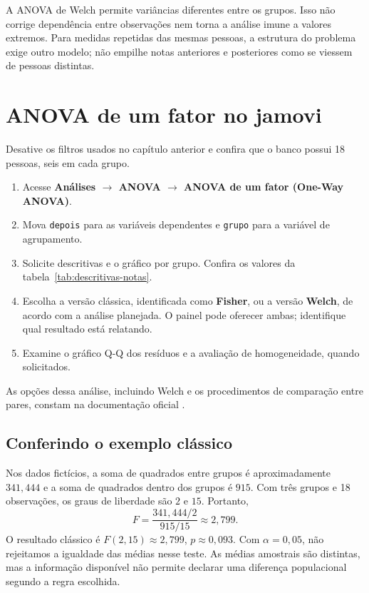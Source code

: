 A ANOVA de Welch permite variâncias diferentes entre os grupos. Isso não corrige dependência entre observações nem torna a análise imune a valores extremos. Para medidas repetidas das mesmas pessoas, a estrutura do problema exige outro modelo; não empilhe notas anteriores e posteriores como se viessem de pessoas distintas.

\section{ANOVA de um fator no jamovi}

Desative os filtros usados no capítulo anterior e confira que o banco possui 18 pessoas, seis em cada grupo.

\begin{enumerate}
  \item Acesse \textbf{Análises $\rightarrow$ ANOVA $\rightarrow$ ANOVA de um fator (One-Way ANOVA)}.
  \item Mova \texttt{depois} para as variáveis dependentes e \texttt{grupo} para a variável de agrupamento.
  \item Solicite descritivas e o gráfico por grupo. Confira os valores da tabela~\ref{tab:descritivas-notas}.
  \item Escolha a versão clássica, identificada como \textbf{Fisher}, ou a versão \textbf{Welch}, de acordo com a análise planejada. O painel pode oferecer ambas; identifique qual resultado está relatando.
  \item Examine o gráfico Q-Q dos resíduos e a avaliação de homogeneidade, quando solicitados.
\end{enumerate}

As opções dessa análise, incluindo Welch e os procedimentos de comparação entre pares, constam na documentação oficial \parencite{JamoviAnova}.

\subsection{Conferindo o exemplo clássico}

Nos dados fictícios, a soma de quadrados entre grupos é aproximadamente $341{,}444$ e a soma de quadrados dentro dos grupos é $915$. Com três grupos e 18 observações, os graus de liberdade são $2$ e $15$. Portanto,
\[
F=\frac{341{,}444/2}{915/15}\approx2{,}799.
\]
O resultado clássico é $F(2,15)\approx2{,}799$, $p\approx0{,}093$. Com $\alpha=0{,}05$, não rejeitamos a igualdade das médias nesse teste. As médias amostrais são distintas, mas a informação disponível não permite declarar uma diferença populacional segundo a regra escolhida.

